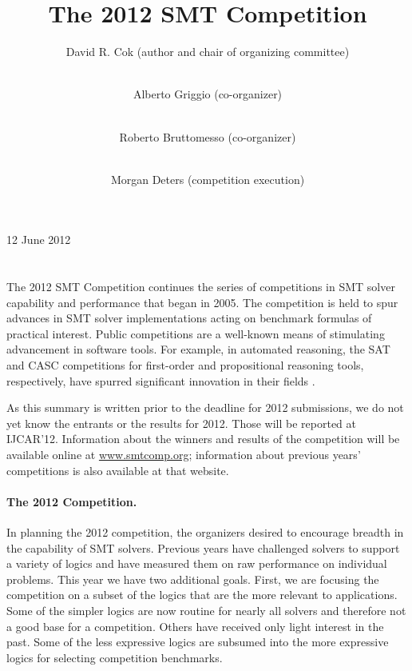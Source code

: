 \documentclass{llncs}
\begin{document}
\title{The 2012 SMT Competition}

\author{David R. Cok (author and chair of organizing committee) \and \\ 
Alberto Griggio (co-organizer) \and \\ 
Roberto Bruttomesso (co-organizer) \and \\
Morgan Deters (competition execution)  \\
}




\maketitle

\centerline{12 June 2012}

\section*{}

The 2012 SMT Competition continues the series of competitions in SMT solver capability and performance that began in 2005.
The competition is held to spur advances in
SMT solver implementations acting on benchmark formulas of practical interest. Public competitions are
a well-known means of stimulating advancement in software tools. For example, in automated
reasoning, the SAT and CASC competitions for first-order and propositional reasoning tools, respectively,
have spurred significant innovation in their fields \cite{leberre+03,PSS02}.

As this summary is written prior to the deadline for 2012 submissions, we do not yet know the 
entrants or the results for 2012. Those will be reported at IJCAR'12. Information about the winners
and results of the competition will be available online at \url{www.smtcomp.org}; information
about previous years' competitions is also available at that website.

\paragraph{The 2012 Competition.} In planning the 2012 competition, the organizers desired to encourage breadth
in the capability of SMT solvers. Previous years have challenged solvers to support a variety of logics and
have measured them on raw performance on individual problems. This year we have two additional goals. First, we
are focusing the competition on a subset of the logics that are the more relevant to applications. Some of the 
simpler logics are now routine for nearly all solvers and therefore not a good base for a competition. Others have 
received only light interest in the past. Some of the less expressive logics are subsumed into the more expressive logics
for selecting competition benchmarks.
\end{document}
